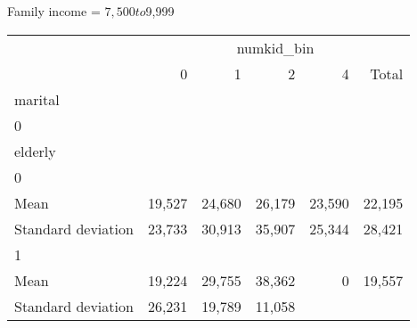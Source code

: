 Family income = $7,500 to $9,999
\begin{tabular}{llllll}
\cline{1-6}
\multicolumn{1}{c}{} &
  \multicolumn{5}{|c}{numkid\_bin} \\
\multicolumn{1}{c}{} &
  \multicolumn{1}{|r}{0} &
  \multicolumn{1}{r}{1} &
  \multicolumn{1}{r}{2} &
  \multicolumn{1}{r}{4} &
  \multicolumn{1}{r}{Total} \\
\cline{1-6}
\multicolumn{1}{l}{marital} &
  \multicolumn{1}{|r}{} &
  \multicolumn{1}{r}{} &
  \multicolumn{1}{r}{} &
  \multicolumn{1}{r}{} &
  \multicolumn{1}{r}{} \\
\multicolumn{1}{l}{\hspace{1em}0} &
  \multicolumn{1}{|r}{} &
  \multicolumn{1}{r}{} &
  \multicolumn{1}{r}{} &
  \multicolumn{1}{r}{} &
  \multicolumn{1}{r}{} \\
\multicolumn{1}{l}{\hspace{2em}elderly} &
  \multicolumn{1}{|r}{} &
  \multicolumn{1}{r}{} &
  \multicolumn{1}{r}{} &
  \multicolumn{1}{r}{} &
  \multicolumn{1}{r}{} \\
\multicolumn{1}{l}{\hspace{3em}0} &
  \multicolumn{1}{|r}{} &
  \multicolumn{1}{r}{} &
  \multicolumn{1}{r}{} &
  \multicolumn{1}{r}{} &
  \multicolumn{1}{r}{} \\
\multicolumn{1}{l}{\hspace{4em}Mean} &
  \multicolumn{1}{|r}{19,527} &
  \multicolumn{1}{r}{24,680} &
  \multicolumn{1}{r}{26,179} &
  \multicolumn{1}{r}{23,590} &
  \multicolumn{1}{r}{22,195} \\
\multicolumn{1}{l}{\hspace{4em}Standard deviation} &
  \multicolumn{1}{|r}{23,733} &
  \multicolumn{1}{r}{30,913} &
  \multicolumn{1}{r}{35,907} &
  \multicolumn{1}{r}{25,344} &
  \multicolumn{1}{r}{28,421} \\
\multicolumn{1}{l}{\hspace{3em}1} &
  \multicolumn{1}{|r}{} &
  \multicolumn{1}{r}{} &
  \multicolumn{1}{r}{} &
  \multicolumn{1}{r}{} &
  \multicolumn{1}{r}{} \\
\multicolumn{1}{l}{\hspace{4em}Mean} &
  \multicolumn{1}{|r}{19,224} &
  \multicolumn{1}{r}{29,755} &
  \multicolumn{1}{r}{38,362} &
  \multicolumn{1}{r}{0} &
  \multicolumn{1}{r}{19,557} \\
\multicolumn{1}{l}{\hspace{4em}Standard deviation} &
  \multicolumn{1}{|r}{26,231} &
  \multicolumn{1}{r}{19,789} &
  \multicolumn{1}{r}{11,058} &

\end{tabular}
